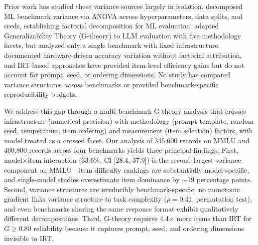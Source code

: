 \documentclass[11pt]{article}
\begin{document}
Prior work has studied these variance sources largely in isolation.
\citet{bouthillier2021} decomposed ML benchmark variance via ANOVA across hyperparameters, data splits, and seeds, establishing factorial decomposition for ML evaluation.
\citet{mesting2026} adapted Generalizability Theory (G-theory) to LLM evaluation with five methodology facets, but analyzed only a single benchmark with fixed infrastructure.
\citet{yuan2025} documented hardware-driven accuracy variation without factorial attribution, and IRT-based approaches \citep{lalor2019,rodriguez2021,polo2024} have provided item-level efficiency gains but do not account for prompt, seed, or ordering dimensions.
No study has compared variance structures \emph{across} benchmarks or provided benchmark-specific reproducibility budgets.

We address this gap through a multi-benchmark G-theory analysis that crosses infrastructure (numerical precision) with methodology (prompt template, random seed, temperature, item ordering) and measurement (item selection) factors, with model treated as a crossed facet.
Our analysis of 345{,}600 records on MMLU and 460{,}800 records across four benchmarks yields three principal findings.
First, model$\times$item interaction (33.6\%, CI [28.4, 37.9]) is the second-largest variance component on MMLU---item difficulty rankings are substantially model-specific, and single-model studies overestimate item dominance by $\sim$19 percentage points.
Second, variance structures are irreducibly benchmark-specific: no monotonic gradient links variance structure to task complexity ($p = 0.41$, permutation test), and even benchmarks sharing the same response format exhibit qualitatively different decompositions.
Third, G-theory requires 4.4$\times$ more items than IRT for $G \geq 0.80$ reliability because it captures prompt, seed, and ordering dimensions invisible to IRT.
\end{document}
